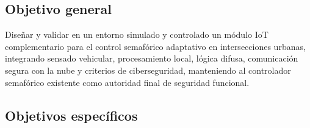 \subsection{Objetivo general}

Diseñar y validar en un entorno simulado y controlado un módulo IoT complementario para el control
semafórico adaptativo en intersecciones urbanas, integrando sensado vehicular, procesamiento local, lógica
difusa, comunicación segura con la nube y criterios de ciberseguridad, manteniendo al controlador semafórico
existente como autoridad final de seguridad funcional.

\subsection{Objetivos específicos}

